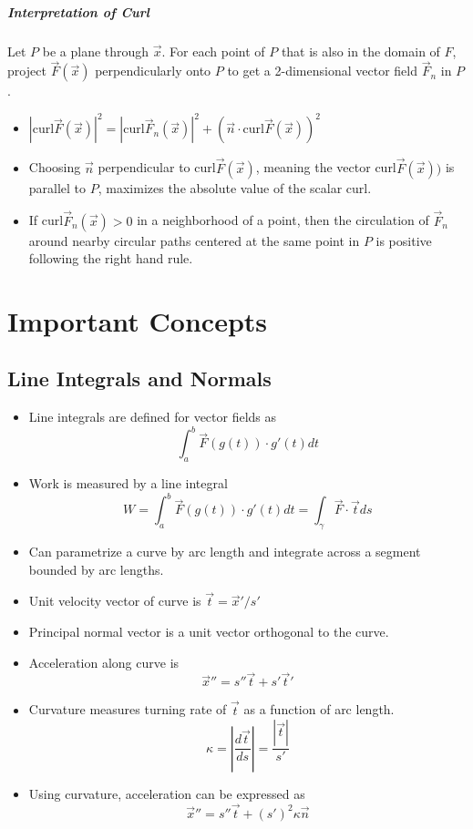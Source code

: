 \documentclass[11pt]{article}
\begin{document}
		\subparagraph{Interpretation of Curl} Let $P$ be a plane through $\vec{x}$. For each point of $P$ that is also in the domain of $F$, project $\vec{F}(\vec{x})$ perpendicularly onto $P$ to get a 2-dimensional vector field $\vec{F}_n$ in $P$.
		\begin{itemize}
			\item $|\text{curl} \vec{F}(\vec{x})|^2 = |\text{curl}\vec{F}_n(\vec{x})|^2 + (\vec{n} \cdot \text{curl}\vec{F}(\vec{x}))^2$
			\item Choosing $\vec{n}$ perpendicular to curl$\vec{F}(\vec{x})$, meaning the vector curl$\vec{F}(\vec{x}))$ is parallel to $P$, maximizes the absolute value of the scalar curl.
			\item If curl$\vec{F}_n(\vec{x}) > 0$ in a neighborhood of a point, then the circulation of $\vec{F}_n$ around nearby circular paths centered at the same point in $P$ is positive following the right hand rule.
		\end{itemize}
		
\section*{Important Concepts}
	\subsection*{Line Integrals and Normals}
		\begin{itemize}
			\item Line integrals are defined for vector fields as
				\[\int_a^b \vec{F}(g(t)) \cdot g'(t)dt\]
			\item Work is measured by a line integral
				\[W = \int_a^b \vec{F}(g(t)) \cdot g'(t)dt = \int_\gamma \vec{F} \cdot \vec{t} ds\]
			\item Can parametrize a curve by arc length and integrate across a segment bounded by arc lengths.
			\item Unit velocity vector of curve is $\vec{t} = \vec{x}' / s'$
			\item Principal normal vector is a unit vector orthogonal to the curve.
			\item Acceleration along curve is
				\[\vec{x}'' = s''\vec{t} + s'\vec{t}'\]
			\item Curvature measures turning rate of $\vec{t}$ as a function of arc length.
				\[\kappa = \left|\frac{d\vec{t}}{ds}\right| = \frac{|\vec{t}|}{s'}\]
			\item Using curvature, acceleration can be expressed as
				\[\vec{x}'' = s''\vec{t} + (s')^2\kappa \vec{n}\]
		\end{itemize}
		
\end{document}
